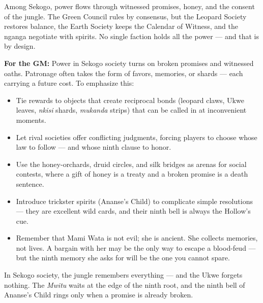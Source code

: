 \begin{tcolorbox}[colback=black!3,colframe=black!40!white,title={Patronage \& Power},breakable]
Among Sekogo, power flows through witnessed promises, honey, and the consent of the jungle. The Green Council rules by consensus, but the Leopard Society restores balance, the Earth Society keeps the Calendar of Witness, and the nganga negotiate with spirits. No single faction holds all the power --- and that is by design.

\textbf{For the GM:}  
Power in Sekogo society turns on broken promises and witnessed oaths. Patronage often takes the form of favors, memories, or shards --- each carrying a future cost. To emphasize this:
\begin{itemize}
\item Tie rewards to objects that create reciprocal bonds (leopard claws, Ukwe leaves, \textit{nkisi} shards, \textit{mukanda} strips) that can be called in at inconvenient moments.
\item Let rival societies offer conflicting judgments, forcing players to choose whose law to follow --- and whose ninth clause to honor.
\item Use the honey-orchards, druid circles, and silk bridges as arenas for social contests, where a gift of honey is a treaty and a broken promise is a death sentence.
\item Introduce trickster spirits (Ananse's Child) to complicate simple resolutions --- they are excellent wild cards, and their ninth bell is always the Hollow's cue.
\item Remember that Mami Wata is not evil; she is ancient. She collects memories, not lives. A bargain with her may be the only way to escape a blood-feud --- but the ninth memory she asks for will be the one you cannot spare.
\end{itemize}
In Sekogo society, the jungle remembers everything --- and the Ukwe forgets nothing. The \textit{Mwitu} waits at the edge of the ninth root, and the ninth bell of Ananse's Child rings only when a promise is already broken.
\end{tcolorbox}

